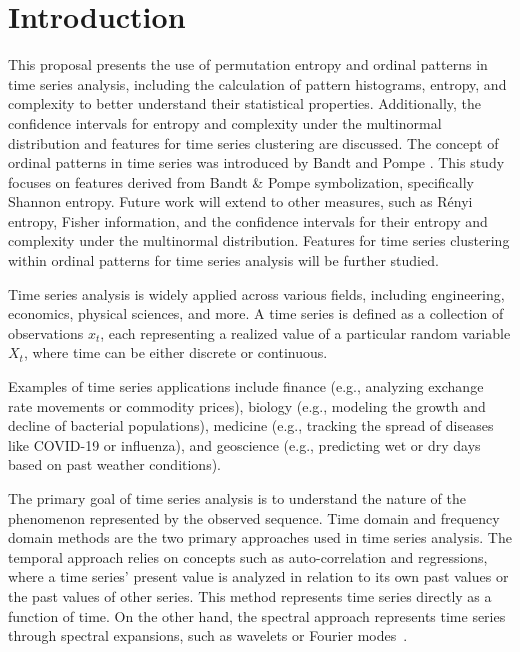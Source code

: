 \chapter{Introduction}\label{C:intro}

This proposal presents the use of permutation entropy 
and ordinal patterns in time series analysis, including the calculation of pattern histograms, entropy, and complexity to better understand their statistical properties. 
Additionally, the confidence intervals for entropy and
complexity under the multinormal distribution and features for time series clustering are discussed. 
The concept of ordinal patterns in time series was introduced by Bandt and Pompe \cite{PhysRevLett.88.174102}. This study focuses on features derived from Bandt \& Pompe symbolization, specifically Shannon entropy. 
Future work will extend to other measures, such as Rényi entropy, Fisher information, and the confidence intervals for their entropy and complexity under the multinormal distribution. Features for time series clustering 
within ordinal patterns for time series analysis will be further studied.

Time series analysis is widely applied across various fields, including engineering, economics, physical sciences, and more. A time series is defined as a collection of observations ${x_t}$, each representing a realized value of a particular random variable $X_t$, where time can be either discrete or continuous.

Examples of time series applications include finance (e.g., analyzing exchange rate movements or commodity prices), biology (e.g., modeling the growth and decline of bacterial populations), medicine (e.g., tracking the spread of diseases like COVID-19 or influenza), and geoscience (e.g., predicting wet or dry days based on past weather conditions).

The primary goal of time series analysis is to understand the nature of the phenomenon represented by the observed sequence. Time domain and frequency domain methods are the two primary approaches used in time series analysis. The temporal approach relies on concepts such as auto-correlation and regressions, where a time series' present value is analyzed in relation to its own past values or the past values of other series. This method represents time series directly as a function of time. On the other hand, the spectral approach represents time series through spectral expansions, such as wavelets or Fourier modes~\cite{treitel1995spectral}.
 
